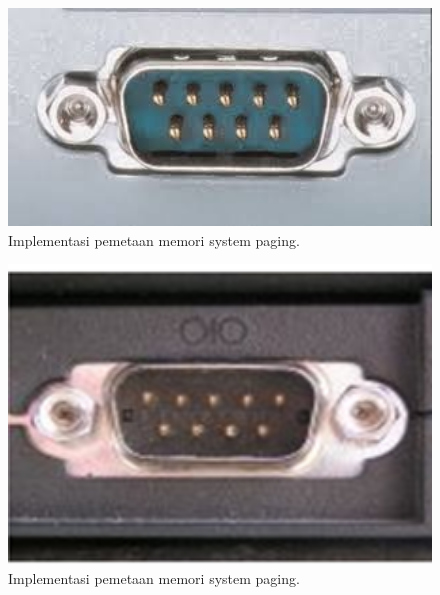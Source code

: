 {{	\begin{figure}[ht]
	\centerline{\includegraphics[width=1\textwidth]{figures/port1.jpg}}
	\caption{Implementasi pemetaan memori system paging.}
	\label{Gambar1}
	\end{figure}

	\begin{figure}[ht]
	\centerline{\includegraphics[width=1\textwidth]{figures/port2.jpg}}
	\caption{Implementasi pemetaan memori system paging.}
	\label{Gambar2}
	\end{figure}

}}
